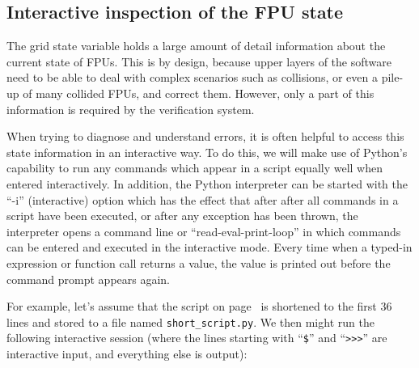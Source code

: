 \documentclass[11pt,a4paper]{report}
\begin{document}
\subsection{Interactive inspection of the FPU state}
\label{sec:fpustate}
The grid state variable holds a large amount of detail information
about the current state of FPUs. This is by design, because upper
layers of the software need to be able to deal with complex scenarios
such as collisions, or even a pile-up of many collided FPUs, and
correct them. However, only a part of this information is required by
the verification system.

When trying to diagnose and understand errors, it is often helpful to
access this state information in an interactive way.  To do this, we
will make use of Python's capability to run any commands which appear
in a script equally well when entered interactively. In addition, the
Python interpreter can be started with the ``-i'' (interactive) option
which has the effect that after after all commands in a script have
been executed, or after any exception has been thrown, the interpreter
opens a command line or ``read-eval-print-loop'' in which commands can
be entered and executed in the interactive mode. Every time when a
typed-in expression or function call returns a value, the value is
printed out before the command prompt appears again.

For example, let's assume that the script on
page~\pageref{sec:minimalexample} is shortened to the first 36 lines
and stored to a file named \texttt{short\_script.py}. We then might
run the following interactive session (where the lines starting with
``\texttt{\$}'' and ``\verb+>>>+'' are interactive input, and
everything else is output):
\end{document}
